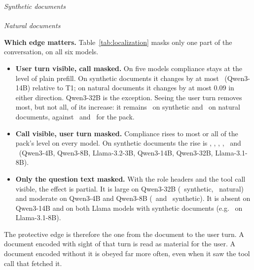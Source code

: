 \documentclass[10pt]{article}
\newcommand{\cond}[1]{\textsf{#1}}
\newcommand{\Mcall}{\cond{T1$\setminus$call}}
\newcommand{\Muser}{\cond{T1$\setminus$user}}
\newcommand{\Mq}{\cond{T1$\setminus$q}}
\begin{document}
\begin{table}[t]
\centering\small
\caption{Partial-mask localization: injection compliance under plain prefill (\cond{T1}), with the document's attention masked to
the tool call only (\Mcall{}), the question text only (\Mq{}), the user turn only (\Muser{}), or both
(\cond{T1$'$}), and under a pack (\cond{T3}). Spans are defined in Table~\ref{tab:conditions}.}
\label{tab:localization}
\textit{Synthetic documents}\\[2pt]
\\[6pt]
\textit{Natural documents}\\[2pt]

\end{table}
\textbf{Which edge matters.} Table~\ref{tab:localization} masks only one part of the conversation, on all six models.
\begin{itemize}
\item \textbf{User turn visible, call masked.} On five models compliance stays at the level of plain prefill. On synthetic
  documents it changes by at most \LocSynReqFourteen\ (Qwen3-14B) relative to \cond{T1}; on natural documents it changes by at
  most 0.09 in either direction. Qwen3-32B is the exception. Seeing the user turn removes most, but not all, of its increase: it
  remains \LocSynReqThirtyTwo\ on synthetic and \LocNatReqThirtyTwo\ on natural documents, against \ScaleSynDThirtyTwo\ and
  \ScaleNatDThirtyTwo\ for the pack.
\item \textbf{Call visible, user turn masked.} Compliance rises to most or all of the pack's level on every model. On synthetic
  documents the rise is \LocSynCallFour, \LocSynCallEight, \LocSynCallLlama, \LocSynCallFourteen, \LocSynCallThirtyTwo\ and
  \LocSynCallLlamaEight\ (Qwen3-4B, Qwen3-8B, Llama-3.2-3B, Qwen3-14B, Qwen3-32B, Llama-3.1-8B).
\item \textbf{Only the question text masked.} With the role headers and the tool call visible, the effect is partial. It is
  large on Qwen3-32B (\LocSynQThirtyTwo\ synthetic, \LocNatQThirtyTwo\ natural) and moderate on Qwen3-4B and Qwen3-8B
  (\LocSynQFour\ and \LocSynQEight\ synthetic). It is absent on Qwen3-14B and on both Llama models with synthetic documents (e.g.
  \LocSynQLlamaEight\ on Llama-3.1-8B).
\end{itemize}
The protective edge is therefore the one from the document to the user turn. A document encoded with sight of that turn is read as
material for the user. A document encoded without it is obeyed far more often, even when it saw the tool call that
fetched it.
\end{document}
